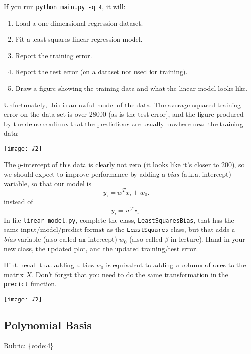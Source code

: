 \documentclass{article}
\def\rubric#1{\gre{Rubric: \{#1\}}}{}
\def\blu#1{{\color{blu}#1}}
\def\gre#1{{\color{gre}#1}}
\newcommand{\centerfig}[2]{\begin{center}\texttt{[image: \#2]}\end{center}}
\def\enum#1{\begin{enumerate}#1\end{enumerate}}
\begin{document}
If you run  \verb|python main.py -q 4|, it will:
\enum{
\item Load a one-dimensional regression dataset.
\item Fit a least-squares linear regression model.
\item Report the training error.
\item Report the test error (on a dataset not used for training).
\item Draw a figure showing the training data and what the linear model looks like.
}
Unfortunately, this is an awful model of the data. The average squared training error on the data set is over 28000
(as is the test error), and the figure produced by the demo confirms that the predictions are usually nowhere near
 the training data:
\centerfig{.5}{../figs/least_squares_no_bias.pdf}
The $y$-intercept of this data is clearly not zero (it looks like it's closer to $200$),
so we should expect to improve performance by adding a \emph{bias} (a.k.a. intercept) variable, so that our model is
\[
y_i = w^Tx_i + w_0.
\]
instead of
\[
y_i = w^Tx_i.
\]
\blu{In file \texttt{linear\string_model.py}, complete the class, \texttt{LeastSquaresBias},
that has the same input/model/predict format as the \texttt{LeastSquares} class,
but that adds a \emph{bias} variable (also called an intercept) $w_0$ (also called $\beta$ in lecture). Hand in your new class, the updated plot,
and the updated training/test error.}

Hint: recall that adding a bias $w_0$ is equivalent to adding a column of ones to the matrix $X$. Don't forget that you need to do the same transformation in the \texttt{predict} function.

\begin{center}
    
\end{center}

\centerfig{1}{../figs/least_squares_bias.pdf}


\subsection{Polynomial Basis}
\rubric{code:4}
\end{document}
